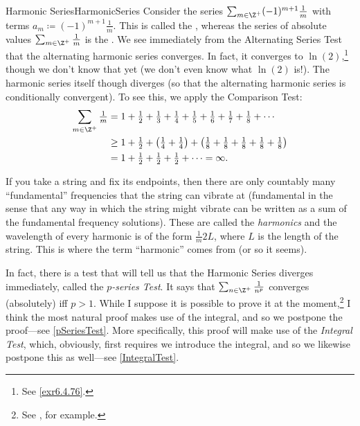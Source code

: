 \begin{exm}{Harmonic Series}{HarmonicSeries}
Consider the series $\sum _{m\in \Z ^+}(-1)^{m+1}\frac{1}{m}$ with terms $a_m\coloneqq (-1)^{m+1}\frac{1}{m}$.  This is called the , whereas the series of absolute values $\sum _{m\in \Z ^+}\frac{1}{m}$ is the .  We see immediately from the Alternating Series Test that the alternating harmonic series converges.  In fact, it converges to $\ln (2)$,\footnote{See \cref{exr6.4.76}.} though we don't know that yet (we don't even know what $\ln (2)$ is!).  The harmonic series itself though diverges (so that the alternating harmonic series is conditionally convergent).  To see this, we apply the Comparison Test:
\begin{equation*}
\begin{split}
\sum _{m\in \Z ^+}\tfrac{1}{m} & =1+\tfrac{1}{2}+\tfrac{1}{3}+\tfrac{1}{4}+\tfrac{1}{5}+\tfrac{1}{6}+\tfrac{1}{7}+\tfrac{1}{8}+\cdots \\
& \geq 1+\tfrac{1}{2}+\left( \tfrac{1}{4}+\tfrac{1}{4}\right) +\left( \tfrac{1}{8}+\tfrac{1}{8}+\tfrac{1}{8}+\tfrac{1}{8}+\tfrac{1}{8}\right) \\
& =1+\tfrac{1}{2}+\tfrac{1}{2}+\tfrac{1}{2}+\cdots =\infty .
\end{split}
\end{equation*}
\begin{rmk}
If you take a string and fix its endpoints, then there are only countably many ``fundamental'' frequencies that the string can vibrate at (fundamental in the sense that any way in which the string might vibrate can be written as a sum of the fundamental frequency solutions).  These are called the \emph{harmonics} and the wavelength of every harmonic is of the form $\frac{1}{m}2L$, where $L$ is the length of the string.  This is where the term ``harmonic'' comes from (or so it seems).
\end{rmk}
\end{exm}
In fact, there is a test that will tell us that the Harmonic Series diverges immediately, called the \emph{$p$-series Test}.  It says that $\sum _{n\in \Z ^+}\frac{1}{n^p}$ converges (absolutely) iff $p>1$.  While I suppose it is possible to prove it at the moment,\footnote{See \cite{Yang}, for example.} I think the most natural proof makes use of the integral, and so we postpone the proof---see \cref{pSeriesTest}.  More specifically, this proof will make use of the \emph{Integral Test}, which, obviously, first requires we introduce the integral, and so we likewise postpone this as well---see \cref{IntegralTest}.

